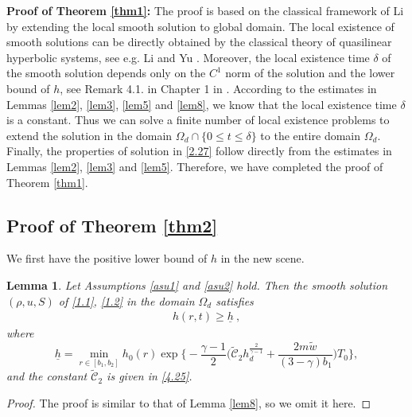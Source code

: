 \documentclass[11pt,reqno]{article}
\newtheorem{lem}{Lemma}[section]
\newcommand{\fr}{\frac}
\numberwithin{equation}{section}
\begin{document}
\textbf{Proof of Theorem \ref{thm1}:} The proof is based on the classical framework of Li \cite{LiBook} by extending the local smooth solution to global domain. The local existence of smooth solutions can be directly obtained by the classical theory of quasilinear hyperbolic systems, see e.g. Li and Yu \cite{Li-Yu}. Moreover, the local existence time $\delta$ of the smooth solution depends only on the $C^1$ norm of the solution and the lower bound of $h$, see Remark 4.1. in Chapter 1 in \cite{Li-Yu}. According to the estimates in Lemmas \ref{lem2}, \ref{lem3}, \ref{lem5} and \ref{lem8}, we know that the local existence time $\delta$ is a constant. Thus we can solve a finite number of
local existence problems to extend the solution in the domain $\Omega_d\cap\{0\leq t\leq \delta\}$ to the entire domain $\Omega_d$. Finally, the properties of solution in \eqref{2.27} follow directly from the estimates in Lemmas \ref{lem2}, \ref{lem3} and \ref{lem5}. Therefore, we have completed the proof of Theorem \ref{thm1}.


\subsection{Proof of Theorem \ref{thm2}}\label{S52}


We first have the positive lower bound of $h$ in the new scene.
\begin{lem}\label{lem9}
Let Assumptions \ref{asu1} and \ref{asu2} hold.
Then the smooth solution $(\rho, u, S)$ of \eqref{1.1}, \eqref{1.2} in the domain $\Omega_d$ satisfies
\begin{align}\label{5.4}
h(r,t)\geq \underline{h}\ ,
\end{align}
where
$$
\underline{h}=\min_{r\in[b_1,b_2]}h_0(r)\exp\bigg\{-\fr{\gamma-1}{2} \bigg(\widetilde{\mathcal{C}}_2h_{d}^{\fr{2}{\gamma-1}}+\fr{2m\tilde{w}}{(3-\gamma)b_1}\bigg)T_0\bigg\},
$$
and the constant $\widetilde{\mathcal{C}}_2$ is given in \eqref{4.25}.
\end{lem}
\begin{proof}
The proof is similar to that of Lemma \ref{lem8}, so we omit it here.
\end{proof}
\end{document}
